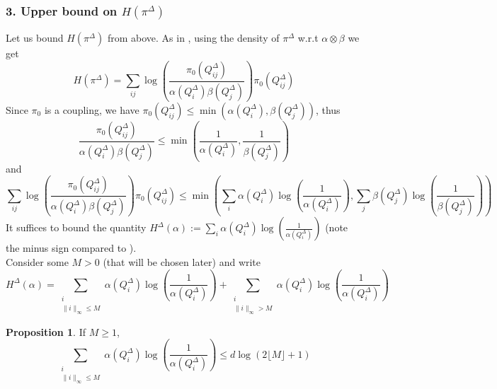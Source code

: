 \documentclass[12pt]{report}
\theoremstyle{definition}
\newtheorem{prop}[defi]{Proposition}
\theoremstyle{remark}
\begin{document}
\subsubsection*{3. Upper bound on $H(\pi^\Delta)$}


\hspace{\parindent} Let us bound $H(\pi^\Delta)$ from above. As in \cite{genevay2018sample}, using the density of $\pi^\Delta$ w.r.t $\alpha\otimes \beta$ we get 
$$H(\pi^\Delta) = \sum_{ij} \log\left(\frac{\pi_0(Q_{ij}^\Delta)}{\alpha(Q_i^\Delta) \beta(Q_j^\Delta)} \right)\pi_0(Q_{ij}^\Delta)$$
Since $\pi_0$ is a coupling, we have $\pi_0(Q_{ij}^\Delta) \leq \min(\alpha(Q_i^\Delta),\beta(Q_j^\Delta))$, thus 
$$\frac{\pi_0(Q_{ij}^\Delta)}{\alpha(Q_i^\Delta) \beta(Q_j^\Delta)}\leq \min\left( \frac{1}{\alpha(Q_i^\Delta)}, \frac{1}{\beta(Q_j^\Delta)}\right)$$
and $$\sum_{ij} \log\left(\frac{\pi_0(Q_{ij}^\Delta)}{\alpha(Q_i^\Delta) \beta(Q_j^\Delta)} \right) \pi_0(Q_{ij}^\Delta) \leq 
\min\left(
\sum_i \alpha(Q_i^\Delta)\log\left(\frac{1}{\alpha(Q_i^\Delta)}\right), \sum_j \beta(Q_j^\Delta)\log\left(\frac{1}{\beta(Q_j^\Delta)}\right) 
\right)$$
It suffices to bound the quantity $H^{\Delta}(\alpha) := \sum_i \alpha(Q_i^\Delta)\log\left(\frac{1}{\alpha(Q_i^\Delta)}\right)$ (note the minus sign compared to \cite{genevay2018sample}).\\
Consider some $M>0$ (that will be chosen later) and write 
\begin{equation*}H^{\Delta}(\alpha) = \sum_{\substack{i\\ \|i\|_\infty\leq M}} \alpha(Q_i^\Delta)\log\left(\frac{1}{\alpha(Q_i^\Delta)}\right) + \sum_{\substack{i\\ \|i\|_\infty > M}} \alpha(Q_i^\Delta)\log\left(\frac{1}{\alpha(Q_i^\Delta)}\right) \tag{4} \label{4}
\end{equation*}

\begin{prop}
	If $M\geq 1$,
$$\sum_{\substack{i\\ \|i\|_\infty\leq M}} \alpha(Q_i^\Delta)\log\left(\frac{1}{\alpha(Q_i^\Delta)}\right) \leq d\log(2\lfloor M \rfloor + 1)$$
\end{prop}
\end{document}
